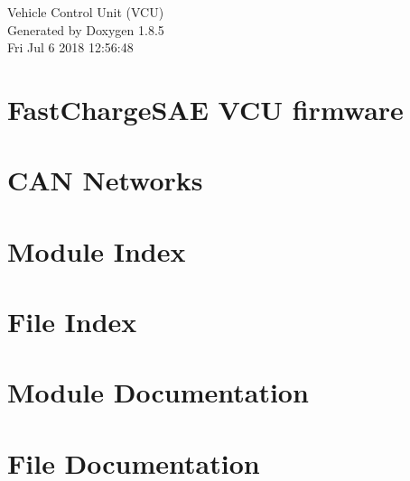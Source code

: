 \documentclass[twoside]{book}
\newcommand{\clearemptydoublepage}{%
  \newpage{\pagestyle{empty}\cleardoublepage}%
}
\begin{document}
\hypersetup{pageanchor=false}
\begin{titlepage}
\vspace*{7cm}
\begin{center}%
{\Large Vehicle Control Unit (V\-C\-U) }\\
\vspace*{1cm}
{\large Generated by Doxygen 1.8.5}\\
\vspace*{0.5cm}
{\small Fri Jul 6 2018 12:56:48}\\
\end{center}
\end{titlepage}
\clearemptydoublepage
\tableofcontents
\clearemptydoublepage
{}
\hypersetup{pageanchor=true}

\chapter{Fast\-Charge\-S\-A\-E V\-C\-U firmware}
\label{index}\hypertarget{index}{}
\chapter{C\-A\-N Networks}
\label{_c_a_n}
\hypertarget{_c_a_n}{}

\chapter{Module Index}

\chapter{File Index}

\chapter{Module Documentation}





\chapter{File Documentation}















\newpage
{}
{}
\printindex
\end{document}

